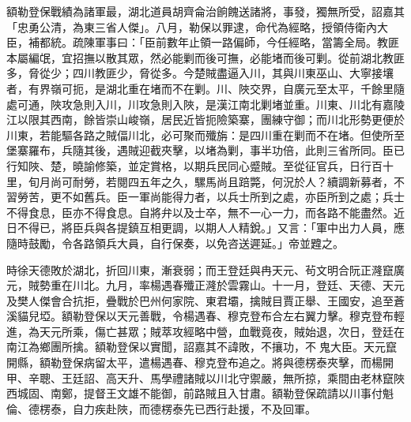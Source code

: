 \begin{pinyinscope}
額勒登保戰績為諸軍最，湖北道員胡齊侖治餉餽送諸將，事發，獨無所受，詔嘉其「忠勇公清，為東三省人傑」。八月，勒保以罪逮，命代為經略，授領侍衛內大臣，補都統。疏陳軍事曰：「臣前數年止領一路偏師，今任經略，當籌全局。教匪本屬編氓，宜招撫以散其眾，然必能剿而後可撫，必能堵而後可剿。從前湖北教匪多，脅從少；四川教匪少，脅從多。今楚賊盡逼入川，其與川東巫山、大寧接壤者，有界嶺可扼，是湖北重在堵而不在剿。川、陜交界，自廣元至太平，千餘里隨處可通，陜攻急則入川，川攻急則入陜，是漢江南北剿堵並重。川東、川北有嘉陵江以限其西南，餘皆崇山峻嶺，居民近皆扼險築寨，團練守御；而川北形勢更便於川東，若能驅各路之賊偪川北，必可聚而殲旃：是四川重在剿而不在堵。但使所至堡寨羅布，兵隨其後，遇賊迎截夾擊，以堵為剿，事半功倍，此則三省所同。臣已行知陜、楚，曉諭修築，並定賞格，以期兵民同心蹙賊。至從征官兵，日行百十里，旬月尚可耐勞，若閱四五年之久，騾馬尚且踣斃，何況於人？續調新募者，不習勞苦，更不如舊兵。臣一軍尚能得力者，以兵士所到之處，亦臣所到之處；兵士不得食息，臣亦不得食息。自將弁以及士卒，無不一心一力，而各路不能盡然。近日不得已，將臣兵與各提鎮互相更調，以期人人精銳。」又言：「軍中出力人員，應隨時鼓勵，令各路領兵大員，自行保奏，以免咨送遲延。」帝並韙之。

時徐天德敗於湖北，折回川東，漸衰弱；而王登廷與冉天元、茍文明合阮正漋竄廣元，賊勢重在川北。九月，率楊遇春殲正漋於雲霧山。十一月，登廷、天德、天元及樊人傑會合抗拒，疊戰於巴州何家院、東君壩，擒賊目賈正舉、王國安，追至蒼溪貓兒埡。額勒登保以天元善戰，令楊遇春、穆克登布合左右翼力擊。穆克登布輕進，為天元所乘，傷亡甚眾；賊萃攻經略中營，血戰竟夜，賊始退，次日，登廷在南江為鄉團所擒。額勒登保以實聞，詔嘉其不諱敗，不攘功，不鬼大臣。天元竄開縣，額勒登保病留太平，遣楊遇春、穆克登布追之。將與德楞泰夾擊，而楊開甲、辛聰、王廷詔、高天升、馬學禮諸賊以川北守禦嚴，無所掠，乘間由老林竄陜西城固、南鄭，提督王文雄不能御，前路賊且入甘肅。額勒登保疏請以川事付魁倫、德楞泰，自力疾赴陜，而德楞泰先已西行赴援，不及回軍。


\end{pinyinscope}
